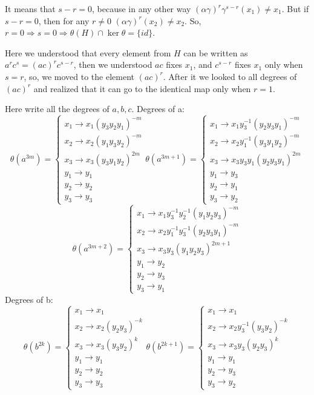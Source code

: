 \documentclass{article}
\begin{document}
It means that $s-r = 0$, because in any other way $(\alpha \gamma)^r \gamma^{s-r} (x_1) \neq x_1$. But if $s-r = 0$, then for any $r \neq 0$ $(\alpha \gamma)^r (x_2) \neq x_2$. So, $r = 0 \Rightarrow s = 0 \Rightarrow \theta(H) \cap \ker \theta = \{id\}$.  

Here we understood that every element from $H$ can be written as $a^rc^s=(ac)^rc^{s-r}$, then we understood $ac$ fixes $x_1$, and $c^{s-r}$ fixes $x_1$ only when $s=r$, so, we moved to the element $(ac)^r$. After it we looked to all degrees of $(ac)^r$ and realized that it can go to the identical map only when $r=1$. 

Here write all the degrees of $a,b,c$.
Degrees of a:
$$
\theta(a^{3m}) =
\begin{cases}
	x_1 \rightarrow x_1 (y_3 y_2 y_1)^{-m}\\
	x_2 \rightarrow x_2 (y_1 y_3 y_2)^{-m}\\
	x_3 \rightarrow x_3 (y_3 y_1 y_2)^{2m}\\
	y_1 \rightarrow y_1\\
	y_2 \rightarrow y_2\\
	y_3 \rightarrow y_3
\end{cases}
\theta(a^{3m+1}) =
\begin{cases}
	x_1 \rightarrow x_1 y_3^{-1} (y_2 y_3 y_1)^{-m}\\
	x_2 \rightarrow x_2 y_1^{-1} (y_3 y_1 y_2)^{-m}\\
	x_3 \rightarrow x_3 y_3 y_1 (y_2 y_3 y_1)^{2m}\\
	y_1 \rightarrow y_3\\
	y_2 \rightarrow y_1\\
	y_3 \rightarrow y_2
\end{cases} 
$$ 
$$
\theta(a^{3m+2}) =
\begin{cases}
	x_1 \rightarrow x_1 y_3^{-1}y_2^{-1} (y_1 y_2 y_3)^{-m}\\
	x_2 \rightarrow x_2 y_1^{-1}y_3^{-1} (y_2 y_3 y_1)^{-m}\\
	x_3 \rightarrow x_3 y_3 (y_1 y_2y_3)^{2m+1}\\
	y_1 \rightarrow y_2\\
	y_2 \rightarrow y_3\\
	y_3 \rightarrow y_1
\end{cases}
$$
Degrees of b:
$$
\theta(b^{2k}) =
\begin{cases}
	x_1 \rightarrow x_1\\
	x_2 \rightarrow x_2 (y_2 y_3)^{-k}\\
	x_3 \rightarrow x_3 (y_3 y_2)^k\\
	y_1 \rightarrow y_1\\
	y_2 \rightarrow y_2\\
	y_3 \rightarrow y_3
\end{cases} 
\theta(b^{2k+1}) =
\begin{cases}
	x_1 \rightarrow x_1 \\
	x_2 \rightarrow x_2 y_3^{-1} (y_3 y_2)^{-k}\\
	x_3 \rightarrow x_3 y_3 (y_2 y_3)^k\\
	y_1 \rightarrow y_1\\
	y_2 \rightarrow y_3\\
	y_3 \rightarrow y_2
\end{cases}
$$
\end{document}
